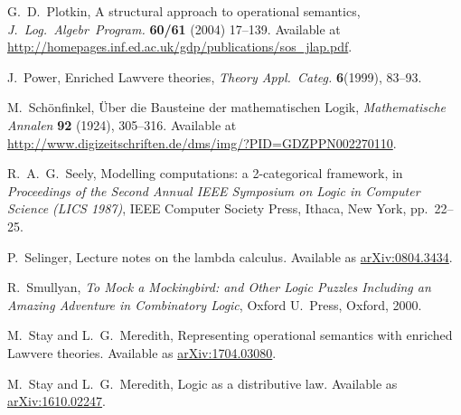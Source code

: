 \documentclass{amsart}
\theoremstyle{definition}
\begin{document}
\begin{thebibliography}{100}
 G.\ D.\ Plotkin, A structural approach to operational semantics, \textsl{J.\ Log.\ Algebr\ Program.} \textbf{60/61} (2004) 17--139.  Available at \href{http://homepages.inf.ed.ac.uk/gdp/publications/sos_jlap.pdf}{http://homepages.inf.ed.ac.uk/gdp/publications/sos\_jlap.pdf}.

 J.\ Power, Enriched Lawvere theories, \textsl{Theory Appl.\ Categ.} \textbf{6}(1999), 83--93.

 M.\ Sch\"{o}nfinkel, \"Uber die Bausteine der mathematischen Logik, 
 \textsl{Mathematische Annalen} \textbf{92} (1924), 305--316.  Available at \href{http://www.digizeitschriften.de/dms/img/?PID=GDZPPN002270110}{http://www.digizeitschriften.de/dms/img/?PID=GDZPPN002270110}.
 
 R.\ A.\ G.\ Seely, Modelling computations: a 2-categorical framework, in
\textsl{Proceedings of the Second Annual IEEE Symposium on Logic in Computer Science (LICS 1987)}, IEEE Computer Society Press, Ithaca, New York, pp.\ 22--25.
 
  P.\ Selinger, Lecture notes on the lambda calculus.  Available as 
 \href{https://arxiv.org/abs/0804.3434}{arXiv:0804.3434}.

 R.\ Smullyan, \textsl{To Mock a Mockingbird: and Other Logic Puzzles Including an Amazing Adventure in Combinatory Logic}, Oxford U.\ Press, Oxford, 2000.
	
 M.\ Stay and L.\ G.\ Meredith, Representing operational semantics 
with enriched Lawvere theories.  Available as
\href{https://arxiv.org/abs/1704.03080}{arXiv:1704.03080}.

 M.\ Stay and L.\ G.\ Meredith, Logic as a distributive law.  Available as \href{https://arxiv.org/abs/1610.02247}{arXiv:1610.02247}.

\end{thebibliography}
\end{document}
